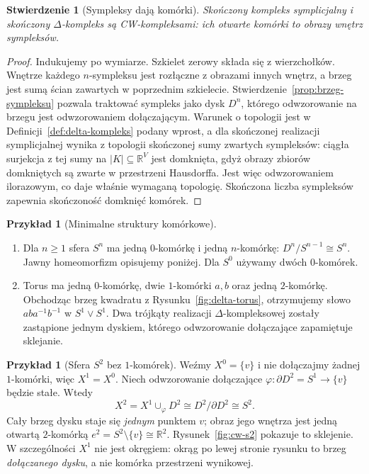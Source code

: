 \documentclass[11pt,a4paper,oneside]{report}
\newcommand{\R}{\mathbb{R}}
\theoremstyle{plain}
\newtheorem{stwierdzenie}[twierdzenie]{Stwierdzenie}
\theoremstyle{definition}
\newtheorem{przyklad}[twierdzenie]{Przykład}
\theoremstyle{remark}
\begin{document}
\begin{stwierdzenie}[Sympleksy dają komórki]
\label{prop:sympleksy-cw}
Skończony kompleks symplicjalny i
skończony $\Delta$-kompleks są
CW-kompleksami: ich otwarte komórki
to obrazy wnętrz sympleksów.
\end{stwierdzenie}
\begin{proof}
Indukujemy po wymiarze. Szkielet
zerowy składa się z wierzchołków.
Wnętrze każdego $n$-sympleksu
jest rozłączne z obrazami innych
wnętrz, a brzeg jest sumą ścian
zawartych w poprzednim szkielecie.
Stwierdzenie~\ref{prop:brzeg-sympleksu}
pozwala traktować sympleks
jako dysk $D^n$, którego
odwzorowanie na brzegu jest odwzorowaniem dołączającym.
Warunek o topologii jest w
Definicji~\ref{def:delta-kompleks}
podany wprost, a dla skończonej
realizacji symplicjalnej wynika
z topologii skończonej sumy zwartych sympleksów:
ciągła surjekcja z tej sumy na $|K|\subseteq\R^V$ jest domknięta,
gdyż obrazy zbiorów domkniętych są zwarte w przestrzeni Hausdorffa.
Jest więc odwzorowaniem ilorazowym, co daje właśnie wymaganą topologię.
Skończona liczba sympleksów
zapewnia skończoność domknięć komórek.
\end{proof}

\begin{przyklad}[Minimalne struktury komórkowe]
\label{prz:cw-sfera-torus}
\begin{enumerate}[label=(\arabic*),leftmargin=*]
\item Dla $n\geq1$ sfera $S^n$
      ma jedną $0$-komórkę i jedną
      $n$-komórkę:
      $D^n/S^{n-1}\cong S^n$.
      Jawny homeomorfizm opisujemy
      poniżej.
      Dla $S^0$ używamy dwóch
      $0$-komórek.
\item Torus ma jedną $0$-komórkę,
      dwie $1$-komórki $a,b$ oraz
      jedną $2$-komórkę. Obchodząc
      brzeg kwadratu z
      Rysunku~\ref{fig:delta-torus},
      otrzymujemy słowo
      $aba^{-1}b^{-1}$ w
      $S^1\vee S^1$.
      Dwa trójkąty realizacji
      $\Delta$-kompleksowej zostały
      zastąpione jednym dyskiem,
      którego odwzorowanie dołączające
      zapamiętuje sklejanie.
\end{enumerate}
\end{przyklad}

\begin{przyklad}[Sfera $S^2$ bez $1$-komórek]
\label{prz:cw-s2}
Weźmy $X^0=\{v\}$ i nie dołączajmy
żadnej $1$-komórki, więc $X^1=X^0$.
Niech odwzorowanie dołączające
$\varphi:\partial D^2=S^1\to\{v\}$
będzie stałe. Wtedy
\[
 X^2=X^1\cup_\varphi D^2
 \cong D^2/\partial D^2\cong S^2.
\]
Cały brzeg dysku staje się \emph{jednym}
punktem $v$; obraz jego wnętrza
jest jedną otwartą $2$-komórką
$e^2=S^2\setminus\{v\}\cong\R^2$.
Rysunek~\ref{fig:cw-s2} pokazuje to
sklejenie. W szczególności
$X^1$ nie jest okręgiem:
okrąg po lewej stronie rysunku
to brzeg \emph{dołączanego dysku},
a nie komórka przestrzeni wynikowej.
\end{przyklad}
\end{document}
